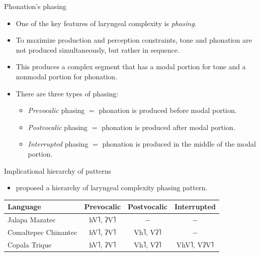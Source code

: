 \documentclass[professionalfonts]{beamer}
\providecommand{\lsptoprule}{\midrule\toprule}
\providecommand{\lspbottomrule}{\bottomrule\midrule}
\begin{document}
\begin{frame}{Phonation's phasing}
  \begin{itemize}
    \item One of the key features of laryngeal complexity is \textit{phasing}.
    \item To maximize production and perception constraints, tone and phonation are not produced simultaneously, but rather in sequence.
    \item This produces a complex segment that has a modal portion for tone and a nonmodal portion for phonation.
    \item There are three types of phasing:
    \begin{itemize}
      \item \textit{Prevocalic} phasing $=$ phonation is produced before modal portion.
      \item \textit{Postvocalic} phasing $=$ phonation is produced after modal portion.
      \item \textit{Interrupted} phasing $=$ phonation is produced in the middle of the modal portion.
    \end{itemize}
  \end{itemize}
\end{frame}

\begin{frame}{Implicational hierarchy of patterns}
  \begin{itemize}
    \item \citet{silvermanLaryngealComplexityOtomanguean1997} proposed a hierarchy of laryngeal complexity phasing pattern.
  \end{itemize}
  \begin{table}
    \begin{tabular}{lccc}
        \lsptoprule
        \textbf{Language} & \textbf{Prevocalic} & \textbf{Postvocalic} & \textbf{Interrupted} \\
        \midrule
        Jalapa Mazatec & hV˥, ʔV˥ & $-$ & $-$ \\
        Comaltepec Chinantec & hV˥, ʔV˥ & Vh˥, Vʔ˥ & $-$ \\
        Copala Trique & hV˥, ʔV˥ & Vh˥, Vʔ˥ & VhV˥, VʔV˥ \\
        \lspbottomrule
    \end{tabular}
  \end{table}
\end{frame}
\end{document}
